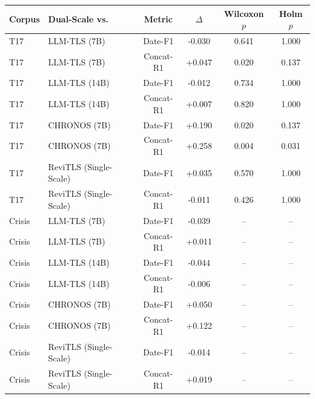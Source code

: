 \begin{tabular}{@{}llcccc@{}}
\toprule
\textbf{Corpus} & \textbf{Dual-Scale vs.} & \textbf{Metric} & $\Delta$ & \textbf{Wilcoxon $p$} & \textbf{Holm $p$} \\
\midrule
T17 & LLM-TLS (7B) & Date-F1 & -0.030 & 0.641 & 1.000 \\
T17 & LLM-TLS (7B) & Concat-R1 & +0.047 & 0.020 & 0.137 \\
T17 & LLM-TLS (14B) & Date-F1 & -0.012 & 0.734 & 1.000 \\
T17 & LLM-TLS (14B) & Concat-R1 & +0.007 & 0.820 & 1.000 \\
T17 & CHRONOS (7B) & Date-F1 & +0.190 & 0.020 & 0.137 \\
T17 & CHRONOS (7B) & Concat-R1 & +0.258 & 0.004 & 0.031 \\
T17 & ReviTLS (Single-Scale) & Date-F1 & +0.035 & 0.570 & 1.000 \\
T17 & ReviTLS (Single-Scale) & Concat-R1 & -0.011 & 0.426 & 1.000 \\
Crisis & LLM-TLS (7B) & Date-F1 & -0.039 & -- & -- \\
Crisis & LLM-TLS (7B) & Concat-R1 & +0.011 & -- & -- \\
Crisis & LLM-TLS (14B) & Date-F1 & -0.044 & -- & -- \\
Crisis & LLM-TLS (14B) & Concat-R1 & -0.006 & -- & -- \\
Crisis & CHRONOS (7B) & Date-F1 & +0.050 & -- & -- \\
Crisis & CHRONOS (7B) & Concat-R1 & +0.122 & -- & -- \\
Crisis & ReviTLS (Single-Scale) & Date-F1 & -0.014 & -- & -- \\
Crisis & ReviTLS (Single-Scale) & Concat-R1 & +0.019 & -- & -- \\
\bottomrule
\end{tabular}
